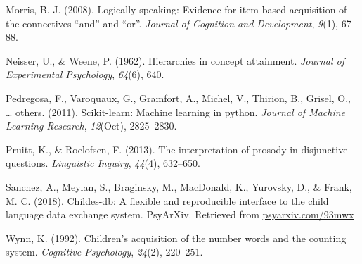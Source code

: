 \documentclass[floatsintext,man]{apa6}
\theoremstyle{definition}
\theoremstyle{definition}
\theoremstyle{definition}
\theoremstyle{remark}
\begin{document}
\hypertarget{ref-morris2008logically}{}
Morris, B. J. (2008). Logically speaking: Evidence for item-based
acquisition of the connectives ``and'' and ``or''. \emph{Journal of
Cognition and Development}, \emph{9}(1), 67--88.

\hypertarget{ref-neisser1962hierarchies}{}
Neisser, U., \& Weene, P. (1962). Hierarchies in concept attainment.
\emph{Journal of Experimental Psychology}, \emph{64}(6), 640.

\hypertarget{ref-pedregosa2011scikit}{}
Pedregosa, F., Varoquaux, G., Gramfort, A., Michel, V., Thirion, B.,
Grisel, O., \ldots{} others. (2011). Scikit-learn: Machine learning in
python. \emph{Journal of Machine Learning Research}, \emph{12}(Oct),
2825--2830.

\hypertarget{ref-pruitt2013interpretation}{}
Pruitt, K., \& Roelofsen, F. (2013). The interpretation of prosody in
disjunctive questions. \emph{Linguistic Inquiry}, \emph{44}(4),
632--650.

\hypertarget{ref-sanchez2018childes}{}
Sanchez, A., Meylan, S., Braginsky, M., MacDonald, K., Yurovsky, D., \&
Frank, M. C. (2018). Childes-db: A flexible and reproducible interface
to the child language data exchange system. PsyArXiv. Retrieved from
\url{psyarxiv.com/93mwx}

\hypertarget{ref-wynn1992children}{}
Wynn, K. (1992). Children's acquisition of the number words and the
counting system. \emph{Cognitive Psychology}, \emph{24}(2), 220--251.
\end{document}
